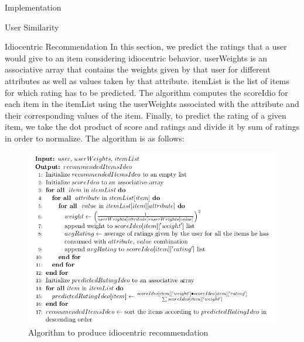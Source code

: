 \documentclass{report}
\begin{document}
\begin{projChapter}{Implementation}
\begin{projSection}{User Similarity}
\end{projSection}
\begin{projSection}{Idiocentric Recommendation}
            In this section, we predict the ratings that a user would give to an item considering idiocentric behavior. userWeights is an associative array that contains the weights given by that user for different attributes as well as values taken by that attribute. itemList is the list of items for which rating has to be predicted. The algorithm computes the scoreIdio for each item in the itemList using the userWeights associated with the attribute and their corresponding values of the item.  Finally, to predict the rating of a given item, we take the dot product of score and ratings and divide it by sum of ratings in order to normalize. The algorithm is as follows:
            \begin{figure}[ht!]
\centering
\includegraphics[scale=0.6]{images/idiocentric.png}
\caption{Algorithm to produce idiocentric recommendation}
\label{idiocentric}
\end{figure}


\end{projSection}
\end{projChapter}
\end{document}
